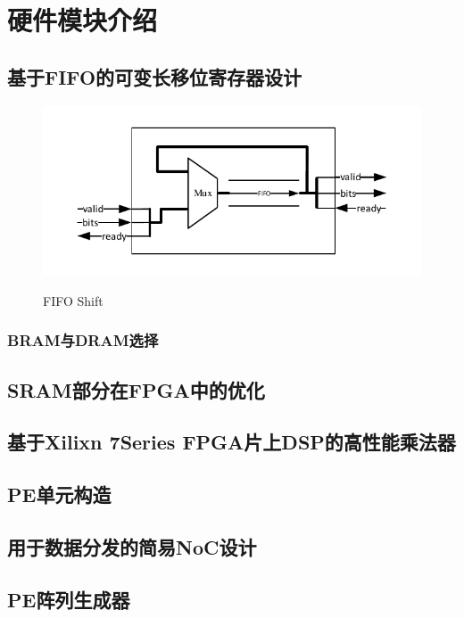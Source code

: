 \chapter{硬件模块介绍}

\section{基于FIFO的可变长移位寄存器设计}

\begin{figure}[h]
    \centering
    \includegraphics{../pdf/fifoshift.pdf}\\
    \caption{FIFO Shift}
\end{figure}

    \subsection{BRAM与DRAM选择}

\section{SRAM部分在FPGA中的优化}

\section{基于Xilixn 7Series FPGA片上DSP的高性能乘法器}

\section{PE单元构造}

\section{用于数据分发的简易NoC设计}

\section{PE阵列生成器}
